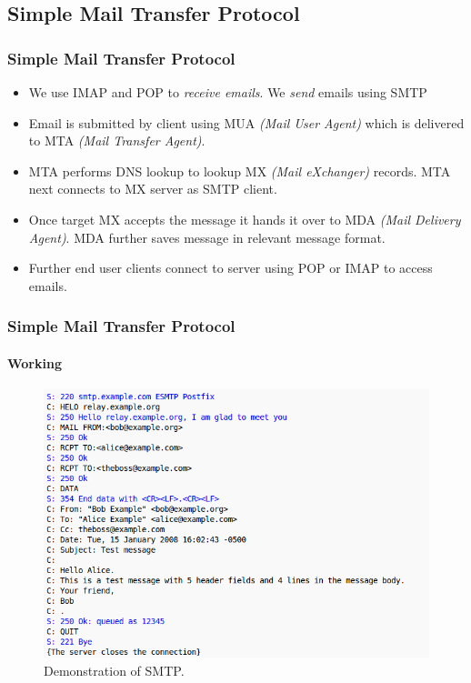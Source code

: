 \documentclass{beamer}
\begin{document}
\subsection{Simple Mail Transfer Protocol}
\begin{frame}
  \frametitle{Simple Mail Transfer Protocol}
  \begin{itemize}
    \item We use IMAP and POP to \emph{receive emails}. We \emph{send} emails using SMTP
    \item Email is submitted by client using MUA \emph{(Mail User Agent)} which is delivered to MTA \emph{(Mail Transfer Agent)}.
    \item MTA performs DNS lookup to lookup MX \emph{(Mail eXchanger)} records. MTA next connects to MX server as SMTP client.
    \item Once target MX accepts the message it hands it over to MDA \emph{(Mail Delivery Agent)}. MDA further saves message in relevant message format.
    \item Further end user clients connect to server using POP or IMAP to access emails.
  \end{itemize}
\end{frame}
\begin{frame}
  \frametitle{Simple Mail Transfer Protocol}
  \framesubtitle{Working}
  \begin{figure}[h]
    \includegraphics[scale = 0.35]{SMTP.png}
    \caption{Demonstration of SMTP.}
    \centering
  \end{figure}
\end{frame}
\end{document}
